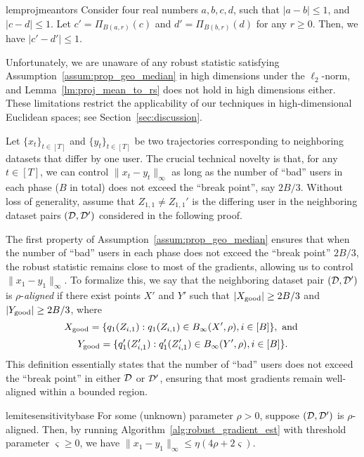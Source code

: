 \begin{restatable}{lem}{projmeantors}
\label{lm:proj_mean_to_rs}
Consider four real numbers $a,b,c,d$, such that $|a-b|\le 1$, and $|c-d|\le 1$.
Let $c'=\Pi_{B(a,r)}(c)$ and $d'=\Pi_{B(b,r)}(d)$ for any $r\ge 0$.
Then, we have $|c'-d'|\le 1.$
\end{restatable} 


Unfortunately, we are unaware of any robust statistic satisfying  
Assumption~\ref{assum:prop_geo_median} in high dimensions under the  
$\ell_2$-norm, and Lemma~\ref{lm:proj_mean_to_rs} does not hold in high  
dimensions either. These limitations restrict the applicability of our  
techniques in high-dimensional Euclidean spaces; see Section~\ref{sec:discussion}.  

Let $\{x_t\}_{t \in [T]}$ and $\{y_t\}_{t \in [T]}$ be two trajectories  
corresponding to neighboring datasets that differ by one user. The  
crucial technical novelty is that, for any $t \in [T]$, we can control  
$\|x_t - y_t\|_{\infty}$ as long as the number of ``bad'' users in each  
phase ($B$ in total) does not exceed the ``break point'', say $2B/3$.  
Without loss of generality, assume that $Z_{1,1} \neq Z_{1,1}'$ is the  
differing user in the neighboring dataset pairs $(\mathcal{D}, \mathcal{D}')$  
considered in the following proof.  

The first property of Assumption~\ref{assum:prop_geo_median} ensures that when the number of ``bad'' users in each phase does not exceed the  ``break point'' $2B/3$, the robust statistic remains close to most of the gradients, allowing us to control $\|x_1 - y_1\|_\infty$.  
To formalize this, we say that the neighboring dataset pair 
$(\mathcal{D}, \mathcal{D}')$ is $\rho$-\textit{aligned} if there exist points  
$X'$ and $Y'$ such that $|X_{\mathrm{good}}| \ge 2B/3$ and  
$|Y_{\mathrm{good}}| \ge 2B/3$, where  
\[
    X_{\mathrm{good}} = \{q_1(Z_{i,1}) : q_1(Z_{i,1}) \in B_{\infty}(X', \rho),  
    i \in [B]\},  \text{ and }
\]  
\[
    Y_{\mathrm{good}} = \{q_1'(Z_{i,1}') : q_1'(Z_{i,1}') \in B_{\infty}(Y', \rho),  
    i \in [B]\}.  
\]  
This definition essentially states that the number of ``bad'' users does  
not exceed the ``break point'' in either $\mathcal{D}$ or $\mathcal{D}'$, ensuring  
that most gradients remain well-aligned within a bounded region.

\begin{restatable}{lem}{itesensitivitybase}
    \label{lm:ite_sensitivity_base}
    For some (unknown) parameter $\rho > 0$, suppose $(\mathcal{D}, \mathcal{D}')$  
    is $\rho$-aligned. Then, by running Algorithm~\ref{alg:robust_gradient_est}  
    with threshold parameter $\varsigma \ge 0$, we have $\|x_1 - y_1\|_\infty \le \eta(4\rho + 2\varsigma)$.
\end{restatable}


